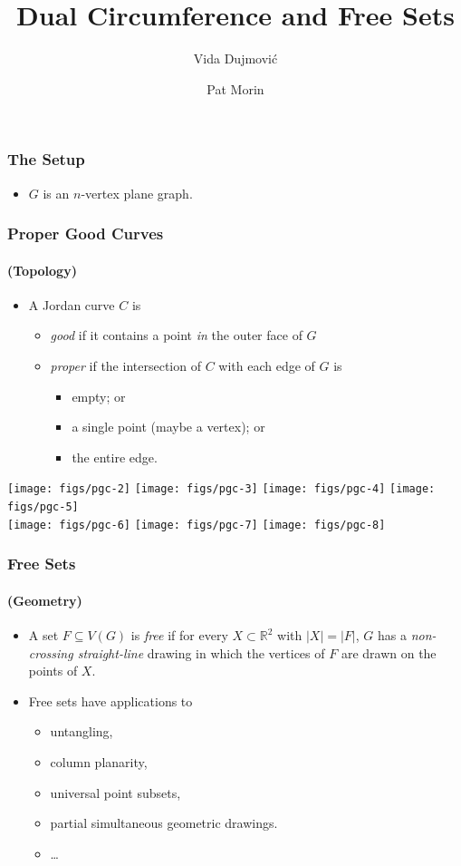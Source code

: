 \documentclass[xcolor=dvipsnames]{beamer}
\title{Dual Circumference and Free Sets}
\author{Vida Dujmović \and Pat Morin}
\newcommand{\R}{\mathbb{R}}
\begin{document}
\begin{frame}
  \titlepage
\end{frame}

\begin{frame}
   \frametitle{The Setup}

   \begin{itemize}
      \item $G$ is an $n$-vertex plane graph.
   \end{itemize}
\end{frame}

\begin{frame}
  \frametitle{Proper Good Curves}
  \framesubtitle{(Topology)}
  
  \begin{itemize}
     \item A Jordan curve $C$ is 
     \begin{itemize}
        \item \emph{good} if it contains a point \emph{in} the outer face of $G$
        \item \emph{proper} if the intersection of $C$ with each edge of $G$ is
         \begin{itemize}
            \item empty; or
            \item a single point (maybe a vertex); or
            \item the entire edge.
         \end{itemize}
     \end{itemize}
  \end{itemize}
  \begin{center}
    \texttt{[image: figs/pgc-2]}
    \texttt{[image: figs/pgc-3]}
    \texttt{[image: figs/pgc-4]}
    \texttt{[image: figs/pgc-5]} \\
    \texttt{[image: figs/pgc-6]}
    \texttt{[image: figs/pgc-7]}
    \texttt{[image: figs/pgc-8]}
  \end{center}
\end{frame}

\begin{frame}
  \frametitle{Free Sets}
  \framesubtitle{(Geometry)}

   \begin{itemize}[<+->]
     \item A set $F\subseteq V(G)$ is \emph{free} if for every
     $X\subset\R^2$ with $|X|=|F|$, $G$ has a \emph{non-crossing
     straight-line} drawing in which the vertices of $F$ are drawn on
     the points of $X$.

     \item Free sets have applications to
     \begin{itemize}
        \item untangling, 
        \item column planarity, 
        \item universal point subsets, 
        \item partial simultaneous geometric drawings.
        \item \ldots
     \end{itemize}
   \end{itemize}
\end{frame}
\end{document}
